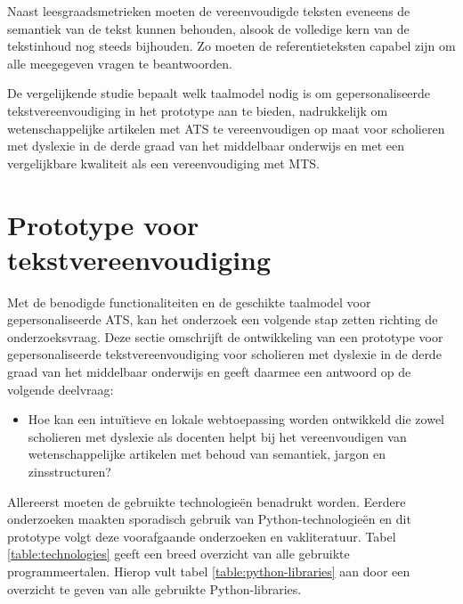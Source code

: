 \medspace

Naast leesgraadsmetrieken moeten de vereenvoudigde teksten eveneens de semantiek van de tekst kunnen behouden, alsook de volledige kern van de tekstinhoud nog steeds bijhouden. Zo moeten de referentieteksten capabel zijn om alle meegegeven vragen te beantwoorden.

\medspace

De vergelijkende studie bepaalt welk taalmodel nodig is om gepersonaliseerde tekstvereenvoudiging in het prototype aan te bieden, nadrukkelijk om wetenschappelijke artikelen met ATS te vereenvoudigen op maat voor scholieren met dyslexie in de derde graad van het middelbaar onderwijs en met een vergelijkbare kwaliteit als een vereenvoudiging met MTS. 








\section{Prototype voor tekstvereenvoudiging}

Met de benodigde functionaliteiten en de geschikte taalmodel voor gepersonaliseerde ATS, kan het onderzoek een volgende stap zetten richting de onderzoeksvraag. Deze sectie omschrijft de ontwikkeling van een prototype voor gepersonaliseerde tekstvereenvoudiging voor scholieren met dyslexie in de derde graad van het middelbaar onderwijs en geeft daarmee een antwoord op de volgende deelvraag: 

\begin{itemize}
	\item Hoe kan een intuïtieve en lokale webtoepassing worden ontwikkeld die zowel scholieren met dyslexie als docenten helpt bij het vereenvoudigen van wetenschappelijke artikelen met behoud van semantiek, jargon en zinsstructuren?
\end{itemize}

Allereerst moeten de gebruikte technologieën benadrukt worden. Eerdere onderzoeken maakten sporadisch gebruik van Python-technologieën en dit prototype volgt deze voorafgaande onderzoeken en vakliteratuur. Tabel \ref{table:technologies} geeft een breed overzicht van alle gebruikte programmeertalen. Hierop vult tabel \ref{table:python-libraries} aan door een overzicht te geven van alle gebruikte Python-libraries.

